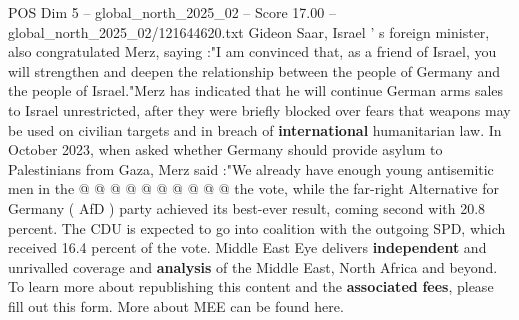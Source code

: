 \begin{textsample}{POS Dim 5 – global\_north\_2025\_02 – Score 17.00 – global\_north\_2025\_02/121644620.txt}
Gideon Saar, Israel ' s foreign minister, also congratulated Merz, saying :"I am convinced that, as a friend of Israel, you will strengthen and deepen the relationship between the people of Germany and the people of Israel."Merz has indicated that he will continue German arms sales to Israel unrestricted, after they were briefly blocked over fears that weapons may be used on civilian targets and in breach of \textbf{international} humanitarian law.
In October 2023, when asked whether Germany should provide asylum to Palestinians from Gaza, Merz said :"We already have enough young antisemitic men in the @ @ @ @ @ @ @ @ @ @ the vote, while the far-right Alternative for Germany ( AfD ) party achieved its best-ever result, coming second with 20.8 percent.
The CDU is expected to go into coalition with the outgoing SPD, which received 16.4 percent of the vote.
Middle East Eye delivers \textbf{independent} and unrivalled coverage and \textbf{analysis} of the Middle East, North Africa and beyond.
To learn more about republishing this content and the \textbf{associated} \textbf{fees}, please fill out this form.
More about MEE can be found here.

\end{textsample}
